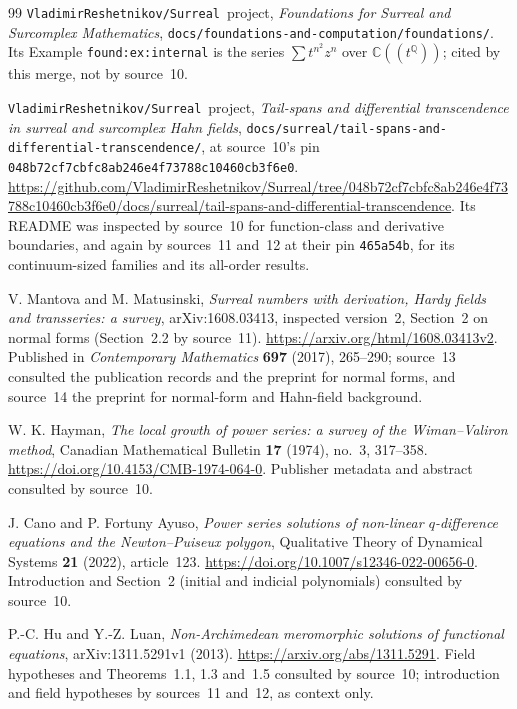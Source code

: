 \documentclass[11pt]{article}
\numberwithin{equation}{section}
\theoremstyle{definition}
\theoremstyle{remark}
\newcommand{\C}{\mathbb C}
\newcommand{\Q}{\mathbb Q}
\newcommand{\repo}{\texttt{VladimirReshetnikov/Surreal}}
\begin{document}
\begin{thebibliography}{99}
\repo\ project,
\emph{Foundations for Surreal and Surcomplex Mathematics},
\texttt{docs/foundations-and-computation/foundations/}.
Its Example \texttt{found:ex:internal} is the series $\sum t^{n^2}z^n$ over
$\C((t^\Q))$; cited by this merge, not by source~10.

\repo\ project,
\emph{Tail-spans and differential transcendence in surreal and surcomplex Hahn
fields},
\texttt{docs/surreal/tail-spans-and-differential-transcendence/}, at
source~10's pin \texttt{048b72cf7cbfc8ab246e4f73788c10460cb3f6e0}.
\url{https://github.com/VladimirReshetnikov/Surreal/tree/048b72cf7cbfc8ab246e4f73788c10460cb3f6e0/docs/surreal/tail-spans-and-differential-transcendence}.
Its README was inspected by source~10 for function-class and derivative
boundaries, and again by sources~11 and~12 at their pin \texttt{465a54b},
for its continuum-sized families and its all-order results.

V. Mantova and M. Matusinski,
\emph{Surreal numbers with derivation, Hardy fields and transseries: a
survey}, arXiv:1608.03413, inspected version~2, Section~2 on normal forms
(Section~2.2 by source~11).
\url{https://arxiv.org/html/1608.03413v2}.
Published in \emph{Contemporary Mathematics} \textbf{697} (2017), 265--290;
source~13 consulted the publication records and the preprint for normal
forms, and source~14 the preprint for normal-form and Hahn-field background.

W. K. Hayman,
\emph{The local growth of power series: a survey of the Wiman--Valiron
method},
Canadian Mathematical Bulletin \textbf{17} (1974), no.~3, 317--358.
\url{https://doi.org/10.4153/CMB-1974-064-0}.
Publisher metadata and abstract consulted by source~10.

J. Cano and P. Fortuny Ayuso,
\emph{Power series solutions of non-linear $q$-difference equations and the
Newton--Puiseux polygon},
Qualitative Theory of Dynamical Systems \textbf{21} (2022), article~123.
\url{https://doi.org/10.1007/s12346-022-00656-0}.
Introduction and Section~2 (initial and indicial polynomials) consulted by
source~10.

P.-C. Hu and Y.-Z. Luan,
\emph{Non-Archimedean meromorphic solutions of functional equations},
arXiv:1311.5291v1 (2013).
\url{https://arxiv.org/abs/1311.5291}.
Field hypotheses and Theorems~1.1, 1.3 and~1.5 consulted by source~10;
introduction and field hypotheses by sources~11 and~12, as context only.


\end{thebibliography}
\end{document}
